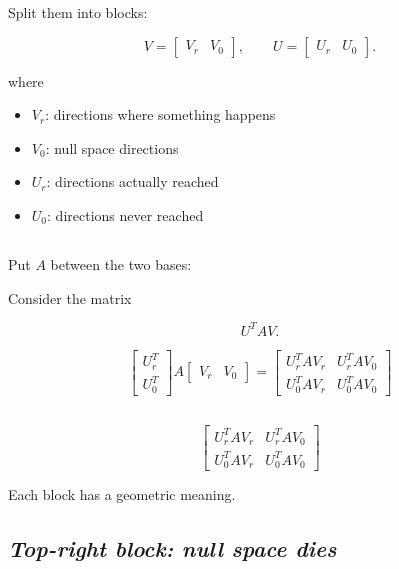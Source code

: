 \documentclass[
  letterpaper,
  DIV=11,
  numbers=noendperiod]{scrartcl}
\providecommand{\tightlist}{%
  \setlength{\itemsep}{0pt}\setlength{\parskip}{0pt}}\usepackage{longtable,booktabs,array}
\begin{document}
Split them into blocks:

\[
V = \begin{bmatrix} V_r & V_0 \end{bmatrix},
\qquad
U = \begin{bmatrix} U_r & U_0 \end{bmatrix}.
\]

where

\begin{itemize}
\tightlist
\item
  \(V_r\): directions where something happens
\item
  \(V_0\): null space directions
\item
  \(U_r\): directions actually reached
\item
  \(U_0\): directions never reached
\end{itemize}

\subsection{\texorpdfstring{\emph{}}{}}\label{section-5}

Put \(A\) between the two bases:

Consider the matrix

\[
U^T A V.
\]

\[
\begin{bmatrix}
U_r^T \\
U_0^T
\end{bmatrix}
A
\begin{bmatrix}
V_r & V_0
\end{bmatrix}=\begin{bmatrix}
U_r^T A V_r & U_r^T A V_0 \\
U_0^T A V_r & U_0^T A V_0
\end{bmatrix}
\]

\subsection{\texorpdfstring{\emph{}}{}}\label{section-6}

\[
\begin{bmatrix}
U_r^T A V_r & U_r^T A V_0 \\
U_0^T A V_r & U_0^T A V_0
\end{bmatrix}
\]

Each block has a geometric meaning.

\subsection{\texorpdfstring{\emph{Top-right block: null space
dies}}{Top-right block: null space dies}}\label{top-right-block-null-space-dies}
\end{document}
